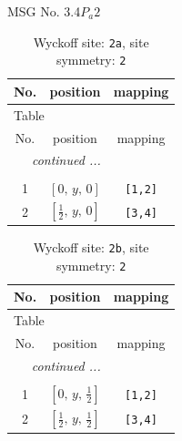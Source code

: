 \documentclass[fleqn,8pt]{jsarticle}
\begin{document}
\setcounter{MaxMatrixCols}{32}

\renewcommand{\tablename}{Table~}
\renewcommand{\figurename}{Figure~}
\begin{center}
\LARGE
MSG No. 3.4\quad$P_{a}2$
\end{center}
\renewcommand{\arraystretch}{1.2}
\begin{longtable}{ccc}
\caption{Wyckoff site: {\tt 2a}, site symmetry: {\tt 2}}
 \\
 \hline \hline
No. & position & mapping \\ \hline \endfirsthead

\multicolumn{2}{l}{\tablename\ \thetable{}} \\
 \hline \hline
No. & position & mapping \\ \hline \endhead

 \hline \hline
\multicolumn{2}{r}{\footnotesize\it continued ...} \\ \endfoot

 \hline \hline
\multicolumn{2}{r}{} \\ \endlastfoot

1 & $\left[ 0,\, y,\, 0 \right]$ & {\tt [1,2]} \\ \hline
2 & $\left[ \frac{1}{2},\, y,\, 0 \right]$ & {\tt [3,4]} \\
\end{longtable}
\renewcommand{\arraystretch}{1.2}
\begin{longtable}{ccc}
\caption{Wyckoff site: {\tt 2b}, site symmetry: {\tt 2}}
 \\
 \hline \hline
No. & position & mapping \\ \hline \endfirsthead

\multicolumn{2}{l}{\tablename\ \thetable{}} \\
 \hline \hline
No. & position & mapping \\ \hline \endhead

 \hline \hline
\multicolumn{2}{r}{\footnotesize\it continued ...} \\ \endfoot

 \hline \hline
\multicolumn{2}{r}{} \\ \endlastfoot

1 & $\left[ 0,\, y,\, \frac{1}{2} \right]$ & {\tt [1,2]} \\ \hline
2 & $\left[ \frac{1}{2},\, y,\, \frac{1}{2} \right]$ & {\tt [3,4]} \\
\end{longtable}
\renewcommand{\arraystretch}{1.2}
\end{document}
